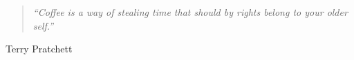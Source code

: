 
\thispagestyle{plain}
\begin{titlepage}
\begin{center}
$\;$
\vspace{4em}
\begin{quotation}
\textit{``Coffee is a way of stealing time that should by rights belong to your older self.''}
\end{quotation}
\begin{flushright}
Terry Pratchett%
\end{flushright}
%
\end{center}
\end{titlepage}
